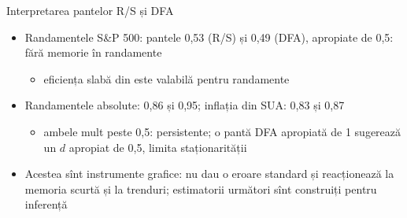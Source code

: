 \begin{frame}{Interpretarea pantelor R/S și DFA}
\itemsize{\small}
\begin{itemize}
    \item Randamentele S\&P 500: pantele 0{,}53 (R/S) și 0{,}49 (DFA), apropiate de 0,5: fără memorie în randamente
    \begin{itemize}
        \item eficiența slabă din  este valabilă pentru randamente
    \end{itemize}
    \item Randamentele absolute: 0{,}86 și 0{,}95; inflația din SUA: 0{,}83 și 0{,}87
    \begin{itemize}
        \item ambele mult peste 0,5: persistente; o pantă DFA apropiată de 1 sugerează un $d$ apropiat de 0,5, limita staționarității
    \end{itemize}
    \item Acestea sînt instrumente grafice: nu dau o eroare standard și reacționează la memoria scurtă și la trenduri; estimatorii următori sînt construiți pentru inferență
\end{itemize}
\end{frame}

